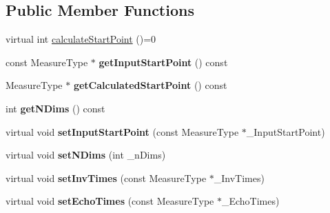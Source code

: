 \subsection*{Public Member Functions}
\begin{DoxyCompactItemize}
\item 
virtual int \hyperlink{class_ox_1_1_start_point_calculator_a9d1132410d68eb16f3f71ec4015c0b2f}{calculate\+Start\+Point} ()=0
\item 
const Measure\+Type $\ast$ {\bfseries get\+Input\+Start\+Point} () const \hypertarget{class_ox_1_1_start_point_calculator_a01bcfb382bec0c4c28ae2bb5783b458c}{}\label{class_ox_1_1_start_point_calculator_a01bcfb382bec0c4c28ae2bb5783b458c}

\item 
Measure\+Type $\ast$ {\bfseries get\+Calculated\+Start\+Point} () const \hypertarget{class_ox_1_1_start_point_calculator_a48b39c1d6bb733821f7297593e424728}{}\label{class_ox_1_1_start_point_calculator_a48b39c1d6bb733821f7297593e424728}

\item 
int {\bfseries get\+N\+Dims} () const \hypertarget{class_ox_1_1_start_point_calculator_a75c73487e21a0f4920762c1efc96d573}{}\label{class_ox_1_1_start_point_calculator_a75c73487e21a0f4920762c1efc96d573}

\item 
virtual void {\bfseries set\+Input\+Start\+Point} (const Measure\+Type $\ast$\+\_\+\+Input\+Start\+Point)\hypertarget{class_ox_1_1_start_point_calculator_ac76047ce4b0d474203cae066471cce61}{}\label{class_ox_1_1_start_point_calculator_ac76047ce4b0d474203cae066471cce61}

\item 
virtual void {\bfseries set\+N\+Dims} (int \+\_\+n\+Dims)\hypertarget{class_ox_1_1_start_point_calculator_a02b51af6d6019cfc47d04b752ad96c86}{}\label{class_ox_1_1_start_point_calculator_a02b51af6d6019cfc47d04b752ad96c86}

\item 
virtual void {\bfseries set\+Inv\+Times} (const Measure\+Type $\ast$\+\_\+\+Inv\+Times)\hypertarget{class_ox_1_1_start_point_calculator_a0632bd0dcf7707930058d63e2176fc7a}{}\label{class_ox_1_1_start_point_calculator_a0632bd0dcf7707930058d63e2176fc7a}

\item 
virtual void {\bfseries set\+Echo\+Times} (const Measure\+Type $\ast$\+\_\+\+Echo\+Times)\hypertarget{class_ox_1_1_start_point_calculator_ab49fe45a4ee7b415edd0948c9fc76fbb}{}\label{class_ox_1_1_start_point_calculator_ab49fe45a4ee7b415edd0948c9fc76fbb}


\end{DoxyCompactItemize}
